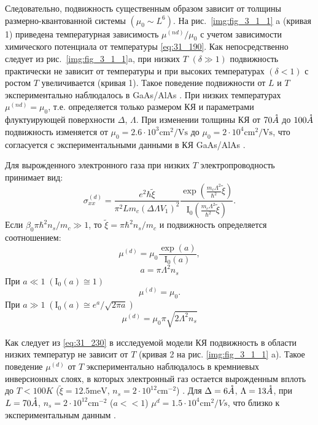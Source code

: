 Следовательно, подвижность существенным образом зависит от толщины размерно-квантованной системы $(\mu _{0} \sim L^{6} )$. На рис.~\ref{img:fig_3_1_1} a (кривая 1) приведена температурная зависимость $\mu ^{(nd)} /\mu _{0} $ с учетом зависимости химического потенциала от температуры \eqref{eq:31_190}. Как непосредственно следует из рис.~\ref{img:fig_3_1_1}a, при низких $T$ $(\delta \gg 1)$ подвижность практически не зависит от температуры и при высоких температурах $(\delta <1)$ с ростом $T$ увеличивается (кривая 1). Такое поведение подвижности от $L$ и $T$ экспериментально наблюдалось в GaAs/AlAs \cite{Sakaki1987}. При низких температурах $\mu ^{(nd)} =\mu _{0} $, т.е. определяется только размером КЯ и параметрами флуктуирующей поверхности $\Delta $, $\Lambda $. При изменении толщины КЯ от $70 \AA$ до $100 \AA$ подвижность изменяется от $\mu _{0} =2.6\cdot 10^{3} \text{cm}^{2} / \text{Vs}$ до $\mu _{0} =2\cdot 10^{4} \text{cm}^{2} /\text{Vs}$, что согласуется с экспериментальными данными в КЯ GaAs/AlAs \cite{Sakaki1987}.

Для вырожденного электронного газа при низких $T$ электропроводность принимает вид:
\begin{equation} \label{eq:31_210}
\sigma _{xx}^{(d)} =\frac{e^2 \hbar \tilde{\xi }}{\pi^2 L m_c \left(\Delta \Lambda V_{1} \right)^2 } \frac{\exp{\left(\frac{m_c \Lambda^2 }{\hbar^2 } \tilde{\xi }\right)}}{\mathrm{I}_0 \left(\frac{m_c \Lambda^2 }{\hbar^2 } \tilde{\xi }\right)}.
\end{equation}
Если $\beta_0 \pi \hbar^2 n_s /m_c \gg 1$, то $\tilde{\xi }=\pi \hbar^2 n_s /m_c$ и подвижность определяется соотношением:
\begin{equation} \label{eq:31_220}
\mu^{(d)} =\mu _{0} \frac{\exp (a)}{\mathrm{I}_0 (a)},
\end{equation}
\[
a=\pi \Lambda ^{2} n_{s}
\]
При $a \ll 1 \; (\mathrm{I}_0 (a) \cong 1)$ 
\begin{equation} \label{eq:31_230}     
\mu ^{(d)} =\mu _{0}.
\end{equation}
При $a \gg 1  \; (\mathrm{I}_0 (a) \cong e^a / \sqrt{2\pi a})$
\begin{equation} \label{eq:31_240}  
\mu ^{(d)} =\mu _{0} \pi \sqrt{2\Lambda ^{2} n_{s} }
\end{equation}

Как следует из \eqref{eq:31_230} в исследуемой модели КЯ подвижность в области низких температур не зависит от $T$ (кривая 2 на рис. \ref{img:fig_3_1_1} a). Такое поведение $\mu^{(d)} $ от $T$ экспериментально наблюдалось в кремниевых инверсионных слоях, в которых электронный газ остается вырожденным вплоть до $T<100 K$ ($\tilde{\xi }=12.5 \text{meV}$, $n_{s} =2\cdot 10^{12} \text{cm}^{-2} $) \cite{Stern1980}. Для $\Delta =6\AA$, $\Lambda =13 \AA$, при $L=70 \AA$, $n_{s} =2\cdot 10^{12}  \text{cm}^{-2} $ ($a<<1$) $\mu ^{d} =1.5\cdot 10^{4} \text{cm}^{2} /{Vs}$, что близко к экспериментальным данным \cite{Stern1980}.

